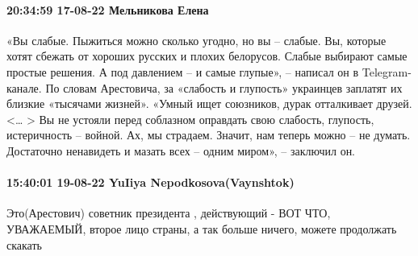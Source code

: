  
 
 
 
 

\paragraph{20:34:59 17-08-22 Мельникова Елена}


«Вы слабые. Пыжиться можно сколько угодно, но вы – слабые. Вы, которые хотят сбежать от хороших русских и плохих белорусов. Слабые выбирают самые простые решения. А под давлением – и самые глупые», – написал он в Telegram-канале.
По словам Арестовича, за «слабость и глупость» украинцев заплатят их близкие «тысячами жизней».
«Умный ищет союзников, дурак отталкивает друзей. <… > Вы не устояли перед соблазном оправдать свою слабость, глупость, истеричность – войной. Ах, мы страдаем. Значит, нам теперь можно – не думать. Достаточно ненавидеть и мазать всех – одним миром», – заключил он.

\paragraph{15:40:01 19-08-22 YuIiya Nepodkosova(Vaynshtok)}

Это(Арестович) советник президента , действующий - ВОТ ЧТО, УВАЖАЕМЫЙ, второе
лицо страны, а так больше ничего, можете продолжать скакать

